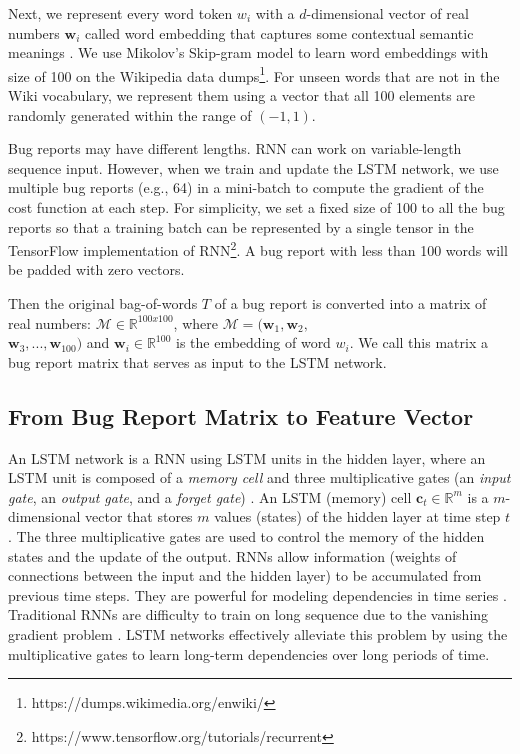 Next, we represent every word token $w_i$ with a $d$-dimensional vector of real numbers $\mathbf{w}_i$ called word embedding that captures some contextual semantic meanings \cite{NIPS2014_5477}. We use Mikolov's Skip-gram model \cite{DBLP:conf/icml/LeM14} to learn word embeddings with size of 100 on the Wikipedia data dumps\footnote{https://dumps.wikimedia.org/enwiki/}. For unseen words that are not in the Wiki vocabulary, we represent them using a vector that all 100 elements are randomly generated within the range of $(-1,1)$.

Bug reports may have different lengths. RNN can work on variable-length sequence input. However, when we train and update the LSTM network, we use multiple bug reports (e.g., 64) in a mini-batch to compute the gradient of the cost function at each step. For simplicity, we set a fixed size of 100 to all the bug reports so that a training batch can be represented by a single tensor in the TensorFlow implementation of RNN\footnote{https://www.tensorflow.org/tutorials/recurrent}. A bug report with less than 100 words will be padded with zero vectors.

Then the original bag-of-words $T$ of a bug report is converted into a matrix of real numbers: $\mathcal{M} \in \mathbb{R}^{100x100}$, where $\mathcal{M} = (\mathbf{w}_1, \mathbf{w}_2, $ \\ $\mathbf{w}_3, ..., \mathbf{w}_{100})$ and $\mathbf{w}_i \in \mathbb{R}^{100}$ is the embedding of word $w_i$. We call this matrix a bug report matrix that serves as input to the LSTM network.

\subsection{From Bug Report Matrix to Feature Vector}
\label{sec:features}
An LSTM network is a RNN using LSTM units in the hidden layer, where an LSTM unit is composed of a \textit{memory cell} and three multiplicative gates (an \textit{input gate}, an \textit{output gate}, and a \textit{forget gate}) \cite{Hochreiter:1997:LSM:1246443.1246450}. An LSTM (memory) cell $\mathbf{c}_t \in \mathbb{R}^{m}$ is a $m$-dimensional vector that stores $m$ values (states) of the hidden layer at time step $t$. The three multiplicative gates are used to control the memory of the hidden states and the update of the output. RNNs allow information (weights of connections between the input and the hidden layer) to be accumulated from previous time steps. They are powerful for modeling dependencies in time series \cite{Sutskever:2014:SSL:2969033.2969173, Goodfellow:2016:DL:3086952}. Traditional RNNs are difficulty to train on long sequence due to the vanishing gradient problem \cite{Bengio:1994:LLD:2325857.2328340}. LSTM networks effectively alleviate this problem by using the multiplicative gates to learn long-term dependencies over long periods of time.

